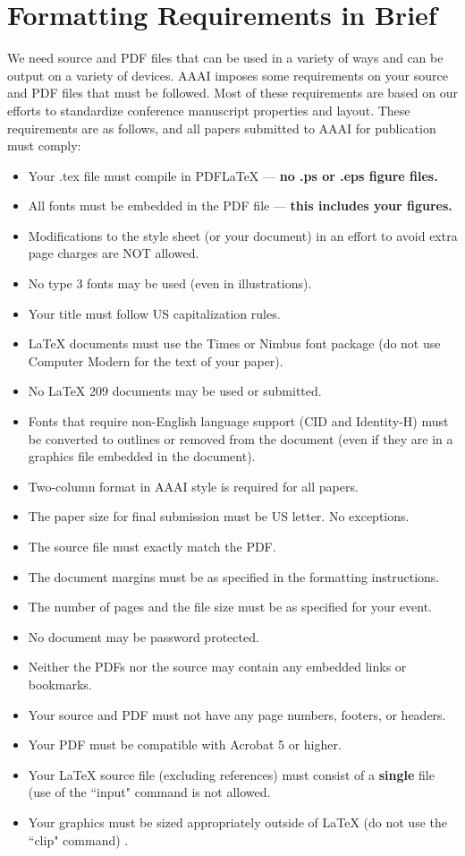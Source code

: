 \documentclass[letterpaper]{article}
\begin{document}
\section{Formatting Requirements in Brief}
We need source and PDF files that can be used in a variety of ways and can be output on a variety of devices. AAAI imposes some requirements on your source and PDF files that must be followed. Most of these requirements are based on our efforts to standardize conference manuscript properties and layout. These requirements are as follows, and all papers submitted to AAAI for publication must comply:

\begin{itemize}
  \item Your .tex file must compile in PDF\LaTeX{} --- \textbf{ no .ps or .eps figure files.}
  \item All fonts must be embedded in the PDF file --- \textbf{ this includes your figures.}
  \item Modifications to the style sheet (or your document) in an effort to avoid extra page charges are NOT allowed.
  \item No type 3 fonts may be used (even in illustrations).
  \item Your title must follow US capitalization rules.
  \item \LaTeX{} documents must use the Times or Nimbus font package (do not use Computer Modern for the text of your paper).
  \item No \LaTeX{} 209 documents may be used or submitted.
  \item Fonts that require non-English language support (CID and Identity-H) must be converted to outlines or removed from the document (even if they are in a graphics file embedded in the document).
  \item Two-column format in AAAI style is required for all papers.
  \item The paper size for final submission must be US letter. No exceptions.
  \item The source file must exactly match the PDF.
  \item The document margins must be as specified in the formatting instructions.
  \item The number of pages and the file size must be as specified for your event.
  \item No document may be password protected.
  \item Neither the PDFs nor the source may contain any embedded links or bookmarks.
  \item Your source and PDF must not have any page numbers, footers, or headers.
  \item Your PDF must be compatible with Acrobat 5 or higher.
  \item Your \LaTeX{} source file (excluding references) must consist of a \textbf{single} file (use of the ``input" command is not allowed.
  \item Your graphics must be sized appropriately outside of \LaTeX{} (do not use the ``clip" command) .
\end{itemize}
\end{document}
